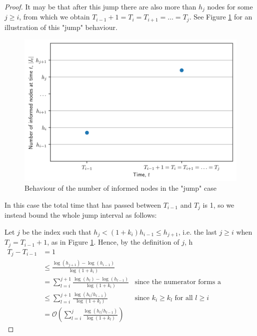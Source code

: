 \begin{proof}
	It may be that after this jump there are also more than $h_j$ nodes for some $j \geq i$, %
	from which we obtain $T_{i-1} + 1 = T_i = T_{i+1} = \dots = T_j$. See Figure \ref{fig:floodingJump} for an illustration of this "jump" behaviour. 
	\begin{figure}[h]
		\centering
		\includegraphics[width=1\textwidth]{./figures/flooding_jump.png}
		\caption{Behaviour of the number of informed nodes in the "jump" case}
		\label{fig:floodingJump}
	\end{figure}
	In this case the total time that has passed between $T_{i-1}$ and $T_j$ is 1, so we instead bound the whole jump interval as follows:
	
	Let $j$ be the index such that $h_j < (1+k_i)h_{i-1} \leq h_{j+1}$, i.e. the last $j \geq i$ when $T_j = T_{i-1} + 1$, as in Figure \ref{fig:floodingJump}. %
	Hence, by the definition of $j$, h
	\begin{align*}
		T_j - T_{i-1} &=1 \\ 
		&\leq \frac{\log (h_{j+1}) - \log(h_{i-1})}{\log(1+k_i) } \\
		& =\sum_{l=i}^{j+1} \frac{\log (h_{l}) - \log(h_{l-1})}{\log(1+k_i) } & \text{since the numerator forms a telescoping sum} \\
		& \leq \sum_{l=i}^{j+1} \frac{\log (h_{l}/h_{l-1})}{\log(1+k_l) } & \text{since } k_i \geq k_l \text{ for all } l \geq i \\
		& = \mathcal{O}\left(\sum_{l=i}^j \frac{\log (h_{l}/h_{l-1})}{\log(1+k_l) }\right)
 	\end{align*}


\end{proof}
